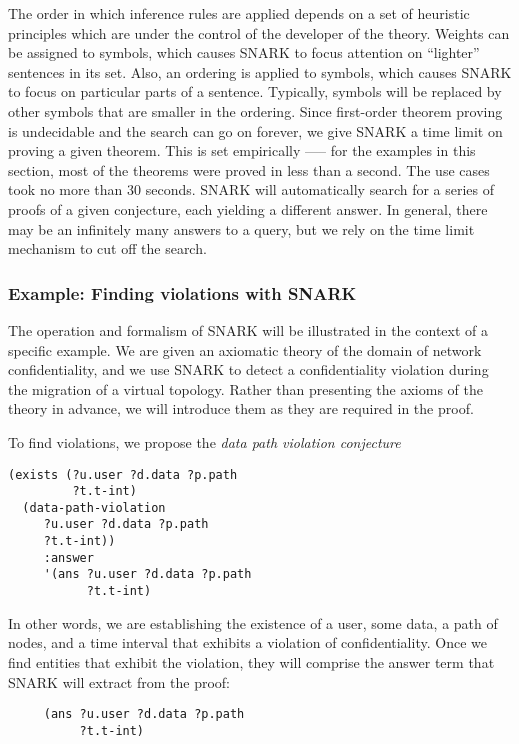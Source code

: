 The order in which inference rules are applied depends on a set of heuristic principles which are under the control of the developer of the theory. 
Weights can be assigned to symbols, which causes SNARK to focus attention on “lighter” sentences in its set. 
Also, an ordering is applied to symbols, which causes SNARK to focus on particular parts of a sentence. 
Typically, symbols will be replaced by other symbols that are smaller in the ordering. 
Since first-order theorem proving is undecidable and the search can go on forever, we give SNARK a time limit on proving a given theorem. 
This is set empirically \-—-- for the examples in this section, most of the theorems were proved in less than a second. The use cases took no more than 30 seconds.
SNARK will automatically search for a series of proofs of a given conjecture, each yielding a different answer.
In general, there may be an infinitely many answers to a query, but we rely on the time limit mechanism to cut off the search.


\subsubsection{Example: Finding violations with SNARK}
\label{sec:find-violation}
The operation and formalism of SNARK will be illustrated in the context of a specific example.
We are given an axiomatic theory of the domain of network confidentiality, and we use SNARK to detect a confidentiality violation during the migration of a virtual topology.  
Rather than presenting the axioms of the theory in advance, we will introduce them as they are required in the proof.

To find violations, we propose the \textit{data path violation conjecture}
\begin{verbatim}
(exists (?u.user ?d.data ?p.path 
         ?t.t-int)
  (data-path-violation 
     ?u.user ?d.data ?p.path 
     ?t.t-int))
     :answer
     '(ans ?u.user ?d.data ?p.path 
           ?t.t-int)
\end{verbatim}

In other words, we are establishing the existence of  a user, some data, a path of nodes, and a time interval that exhibits a violation of confidentiality.  Once we find entities that exhibit the violation, they will comprise the answer term that SNARK will extract from the proof:  
  \begin{verbatim}
     (ans ?u.user ?d.data ?p.path 
          ?t.t-int)
  \end{verbatim}

